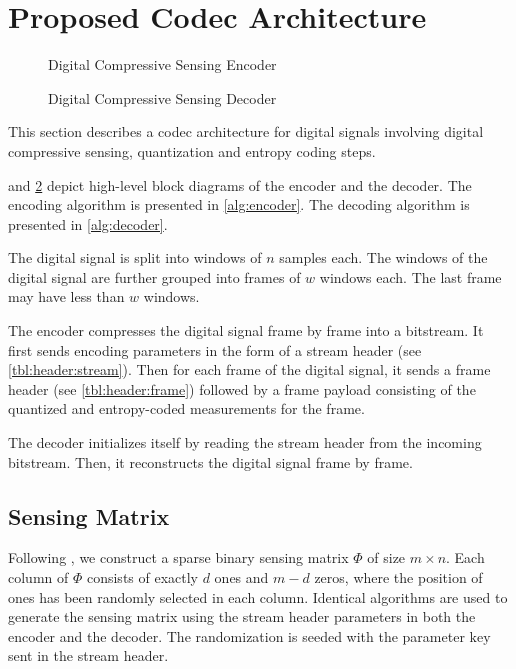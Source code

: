 \section{Proposed Codec Architecture}
\label{sec:arch}
\begin{figure}[!ht]
\centering 

\caption{Digital Compressive Sensing Encoder}
\label{fig-cs-encoder}
\end{figure}

\begin{figure}[!ht]
\centering 

\caption{Digital Compressive Sensing Decoder}
\label{fig-cs-decoder}
\end{figure}
This section describes a codec architecture
for digital signals involving digital
compressive sensing, quantization and entropy
coding steps.

and \cref{fig-cs-decoder}
depict high-level block diagrams of the encoder
and the decoder.
The encoding algorithm is presented in
\cref{alg:encoder}.
The decoding algorithm is presented in
\cref{alg:decoder}.

\begin{figure}[!t]
 \removelatexerror
 \centering

\end{figure}

\begin{figure}[!t]
 \removelatexerror
 \centering

\end{figure}

The digital signal is split into windows
of $n$ samples each. The windows of
the digital signal are further grouped into
frames of $w$ windows each. The
last frame may have less than $w$
windows.

The encoder compresses the digital signal
frame by frame into a bitstream.
It first sends
encoding parameters in the form
of a stream header (see \cref{tbl:header:stream}).
Then for each frame of the digital signal,
it sends a frame header (see \cref{tbl:header:frame})
followed by a frame payload consisting of the
quantized and entropy-coded measurements for the frame.

The decoder initializes itself by reading
the stream header from the incoming bitstream. 
Then, it reconstructs the digital signal
frame by frame.






\subsection{Sensing Matrix}
Following \cite{mamaghanian2011compressed},
we construct a sparse binary sensing matrix $\Phi$ of size
$m \times n$.
Each column of $\Phi$ consists of exactly $d$ ones and
$m-d$ zeros, where the position of ones has been randomly
selected in each column. Identical algorithms are used
to generate the sensing matrix using the stream header
parameters in both the encoder and the decoder.
The randomization is seeded with the parameter $\mathrm{key}$
sent in the stream header.

